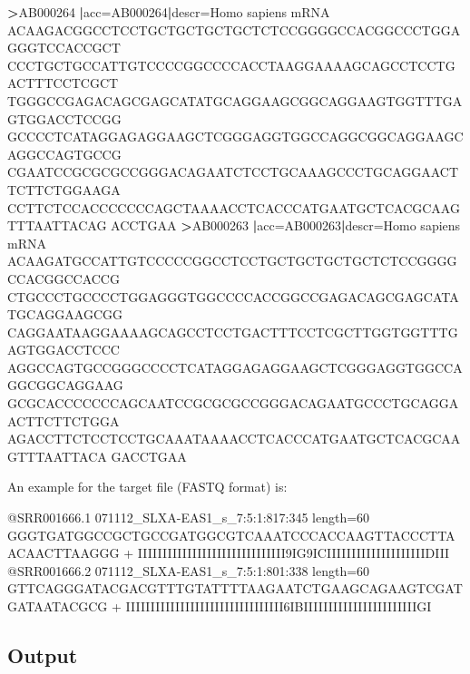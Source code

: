 \documentclass[11pt,]{krantz}
\newenvironment{Shaded}{\begin{snugshade}}{\end{snugshade}}
\newcommand{\KeywordTok}[1]{\textcolor[rgb]{0.27,0.27,0.27}{\textbf{#1}}}
\newcommand{\VariableTok}[1]{\textcolor[rgb]{0,0,0}{#1}}
\newcommand{\OperatorTok}[1]{\textcolor[rgb]{0.43,0.43,0.43}{\textbf{#1}}}
\newcommand{\ExtensionTok}[1]{#1}
\newcommand{\NormalTok}[1]{#1}
\begin{document}
\begin{Shaded}
\begin{Highlighting}[]
\OperatorTok{>}\ExtensionTok{AB000264} \KeywordTok{|}\VariableTok{acc=}\NormalTok{AB000264}\KeywordTok{|}\VariableTok{descr=}\NormalTok{Homo }\ExtensionTok{sapiens}\NormalTok{ mRNA }
\ExtensionTok{ACAAGACGGCCTCCTGCTGCTGCTGCTCTCCGGGGCCACGGCCCTGGAGGGTCCACCGCT}
\ExtensionTok{CCCTGCTGCCATTGTCCCCGGCCCCACCTAAGGAAAAGCAGCCTCCTGACTTTCCTCGCT}
\ExtensionTok{TGGGCCGAGACAGCGAGCATATGCAGGAAGCGGCAGGAAGTGGTTTGAGTGGACCTCCGG}
\ExtensionTok{GCCCCTCATAGGAGAGGAAGCTCGGGAGGTGGCCAGGCGGCAGGAAGCAGGCCAGTGCCG}
\ExtensionTok{CGAATCCGCGCGCCGGGACAGAATCTCCTGCAAAGCCCTGCAGGAACTTCTTCTGGAAGA}
\ExtensionTok{CCTTCTCCACCCCCCCAGCTAAAACCTCACCCATGAATGCTCACGCAAGTTTAATTACAG}
\ExtensionTok{ACCTGAA}
\OperatorTok{>}\ExtensionTok{AB000263} \KeywordTok{|}\VariableTok{acc=}\NormalTok{AB000263}\KeywordTok{|}\VariableTok{descr=}\NormalTok{Homo }\ExtensionTok{sapiens}\NormalTok{ mRNA }
\ExtensionTok{ACAAGATGCCATTGTCCCCCGGCCTCCTGCTGCTGCTGCTCTCCGGGGCCACGGCCACCG}
\ExtensionTok{CTGCCCTGCCCCTGGAGGGTGGCCCCACCGGCCGAGACAGCGAGCATATGCAGGAAGCGG}
\ExtensionTok{CAGGAATAAGGAAAAGCAGCCTCCTGACTTTCCTCGCTTGGTGGTTTGAGTGGACCTCCC}
\ExtensionTok{AGGCCAGTGCCGGGCCCCTCATAGGAGAGGAAGCTCGGGAGGTGGCCAGGCGGCAGGAAG}
\ExtensionTok{GCGCACCCCCCCAGCAATCCGCGCGCCGGGACAGAATGCCCTGCAGGAACTTCTTCTGGA}
\ExtensionTok{AGACCTTCTCCTCCTGCAAATAAAACCTCACCCATGAATGCTCACGCAAGTTTAATTACA}
\ExtensionTok{GACCTGAA}
\end{Highlighting}
\end{Shaded}

An example for the target file (FASTQ format) is:

\begin{Shaded}
\begin{Highlighting}[]
\ExtensionTok{@SRR001666.1}\NormalTok{ 071112_SLXA-EAS1_s_7:5:1:817:345 length=60}
\ExtensionTok{GGGTGATGGCCGCTGCCGATGGCGTCAAATCCCACCAAGTTACCCTTAACAACTTAAGGG}
\ExtensionTok{+}
\ExtensionTok{IIIIIIIIIIIIIIIIIIIIIIIIIIIIII9IG9ICIIIIIIIIIIIIIIIIIIIIDIII}
\ExtensionTok{@SRR001666.2}\NormalTok{ 071112_SLXA-EAS1_s_7:5:1:801:338 length=60}
\ExtensionTok{GTTCAGGGATACGACGTTTGTATTTTAAGAATCTGAAGCAGAAGTCGATGATAATACGCG}
\ExtensionTok{+}
\ExtensionTok{IIIIIIIIIIIIIIIIIIIIIIIIIIIIIIII6IBIIIIIIIIIIIIIIIIIIIIIIIGI}
\end{Highlighting}
\end{Shaded}

\subsection*{Output}\label{output-23}
\end{document}
